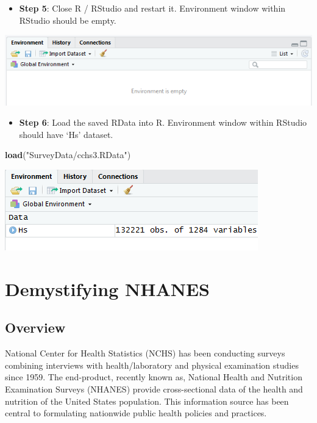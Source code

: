 \documentclass[
]{book}
\newenvironment{Shaded}{\begin{snugshade}}{\end{snugshade}}
\newcommand{\KeywordTok}[1]{\textcolor[rgb]{0.13,0.29,0.53}{\textbf{#1}}}
\newcommand{\NormalTok}[1]{#1}
\newcommand{\StringTok}[1]{\textcolor[rgb]{0.31,0.60,0.02}{#1}}
\providecommand{\tightlist}{%
  \setlength{\itemsep}{0pt}\setlength{\parskip}{0pt}}
\begin{document}
\begin{itemize}
\tightlist
\item
  \textbf{Step 5}: Close R / RStudio and restart it. Environment window within RStudio should be empty.
\end{itemize}

\includegraphics[width=0.65\linewidth]{images/abacus44}

\begin{itemize}
\tightlist
\item
  \textbf{Step 6}: Load the saved RData into R. Environment window within RStudio should have `Hs' dataset.
\end{itemize}

\begin{Shaded}
\begin{Highlighting}[]
\KeywordTok{load}\NormalTok{(}\StringTok{"SurveyData/cchs3.RData"}\NormalTok{)}
\end{Highlighting}
\end{Shaded}

\includegraphics[width=0.65\linewidth]{images/abacus45}

\hypertarget{demystifying-nhanes}{%
\chapter{Demystifying NHANES}\label{demystifying-nhanes}}

\hypertarget{overview}{%
\section{Overview}\label{overview}}

National Center for Health Statistics (NCHS) has been conducting surveys combining interviews with health/laboratory and physical examination studies since 1959. The end-product, recently known as, National Health and Nutrition Examination Surveys (NHANES) provide cross-sectional data of the health and nutrition of the United States population. This information source has been central to formulating nationwide public health policies and practices.
\end{document}
